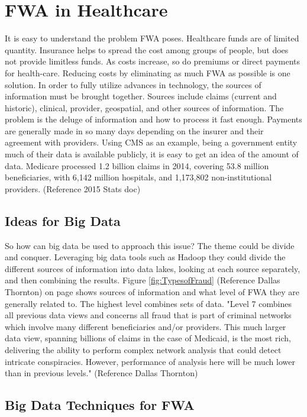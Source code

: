 \documentclass[sigconf]{acmart}
\begin{document}
\section{FWA in Healthcare}

It is easy to understand the problem FWA poses.  Healthcare funds are of limited quantity.  Insurance helps to spread the cost among groups of people, but does not provide limitless funds.  As costs increase, so do premiums or direct payments for health-care.  Reducing costs by eliminating as much FWA as possible is one solution.
In order to fully utilize advances in technology, the sources of information must be brought together.  Sources include claims (current and historic), clinical, provider, geospatial, and other sources of information.  The problem is the deluge of information and how to process it fast enough.  Payments are generally made in so many days depending on the insurer and their agreement with providers.  Using CMS as an example, being a government entity much of their data is available publicly, it is easy to get an idea of the amount of data.  Medicare processed 1.2 billion claims in 2014, covering 53.8 million beneficiaries, with 6,142 million hospitals, and 1,173,802 non-institutional providers.  (Reference 2015 Stats doc)


\subsection{Ideas for Big Data}

So how can big data be used to approach this issue?  The theme could be divide and conquer.  Leveraging big data tools such as Hadoop they could divide the different sources of information into data lakes, looking at each source separately, and then combining the results.  Figure \ref{fig:TypesofFraud} (Reference Dallas Thornton) on page \pageref{fig:TypesofFraud} shows sources of information and what level of FWA they are generally related to.  The highest level combines sets of data.  "Level 7 combines all previous data views and concerns all fraud that is part of criminal networks which involve many different beneficiaries and/or providers. This much larger data view, spanning billions of claims in the case of Medicaid, is the most rich, delivering the ability to perform complex network analysis that could detect intricate conspiracies. However, performance of analysis here will be much lower than in previous levels."  (Reference Dallas Thornton) 

\subsection{Big Data Techniques for FWA}
\end{document}
